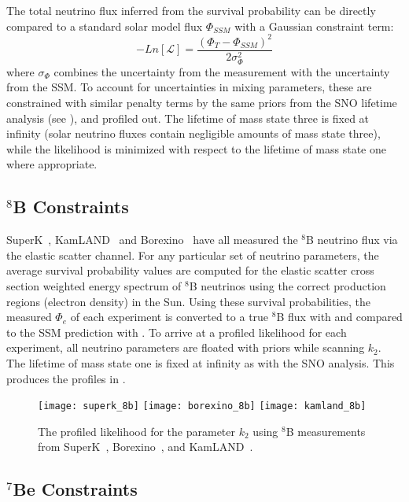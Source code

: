 The total neutrino flux inferred from the survival probability can be directly compared to a standard solar model flux $\Phi_{SSM}$ with a Gaussian constraint term:
\begin{equation}
-Ln[{\mathscr{L}}] = \frac{(\Phi_T - \Phi_{SSM})^2}{2 \sigma_\Phi^2}
\label{combolike}
\end{equation}
where $\sigma_\Phi$ combines the uncertainty from the measurement with the uncertainty from the SSM.
To account for uncertainties in mixing parameters, these are constrained with similar penalty terms by the same priors from the SNO lifetime analysis (see ), and profiled out. 
The lifetime of mass state three is fixed at infinity (solar neutrino fluxes contain negligible amounts of mass state three), while the likelihood is minimized with respect to the lifetime of mass state one where appropriate.

\subsection{$^8$B Constraints}

SuperK~\cite{superkiv}, KamLAND~\cite{kamland8b} and Borexino~\cite{borexino8b} have all measured the $^8$B neutrino flux via the elastic scatter channel. 
For any particular set of neutrino parameters, the average survival probability values are computed for the elastic scatter cross section weighted energy spectrum of $^8$B neutrinos using the correct production regions (electron density) in the Sun. 
Using these survival probabilities, the measured $\Phi_e$ of each experiment is converted to a true $^8$B flux with  and compared to the SSM prediction with .
To arrive at a profiled likelihood for each experiment, all neutrino parameters are floated with priors while scanning $k_2$. The lifetime of mass state one is fixed at infinity as with the SNO analysis. 
This produces the profiles in .

\begin{figure}
\centering
\texttt{[image: superk\_8b]}
\texttt{[image: borexino\_8b]}
\texttt{[image: kamland\_8b]}
\caption{The profiled likelihood for the parameter $k_2$ using $^8$B measurements from SuperK~\cite{superkiv}, Borexino~\cite{borexino8b}, and KamLAND~\cite{kamland8b}.}
\label{fig:8b_profiles}
\end{figure}

\subsection{$^7$Be Constraints}

